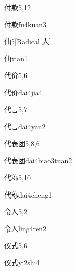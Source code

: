 \begin{entry}{付款}{5,12}
  \begin{phonetics}{付款}{fu4kuan3}
  \end{phonetics}
\end{entry}

\begin{entry}{仙}{5}[Radical 人]
  \begin{phonetics}{仙}{xian1}
  \end{phonetics}
\end{entry}

\begin{entry}{代价}{5,6}
  \begin{phonetics}{代价}{dai4jia4}
  \end{phonetics}
\end{entry}

\begin{entry}{代言}{5,7}
  \begin{phonetics}{代言}{dai4yan2}
  \end{phonetics}
\end{entry}

\begin{entry}{代表团}{5,8,6}
  \begin{phonetics}{代表团}{dai4biao3tuan2}
  \end{phonetics}
\end{entry}

\begin{entry}{代称}{5,10}
  \begin{phonetics}{代称}{dai4cheng1}
  \end{phonetics}
\end{entry}

\begin{entry}{令人}{5,2}
  \begin{phonetics}{令人}{ling4ren2}
  \end{phonetics}
\end{entry}

\begin{entry}{仪式}{5,6}
  \begin{phonetics}{仪式}{yi2shi4}
  \end{phonetics}
\end{entry}

